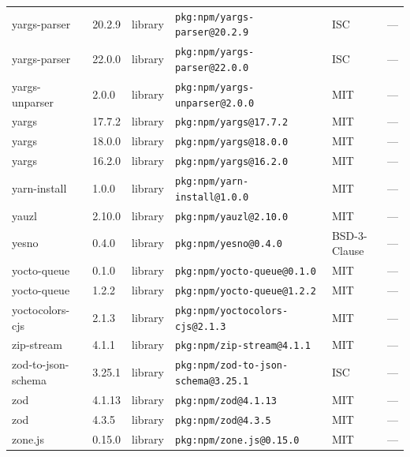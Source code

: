 \documentclass[11pt,a4paper]{article}
\begin{document}
\begin{longtable}{|p{4cm}|p{2cm}|p{1.6cm}|p{5cm}|p{1.5cm}|p{3.5cm}|}
\raggedright yargs-parser & 20.2.9 & library & \small\texttt{pkg:npm/yargs-parser@20.2.9} & ISC & \small — \\
\raggedright yargs-parser & 22.0.0 & library & \small\texttt{pkg:npm/yargs-parser@22.0.0} & ISC & \small — \\
\raggedright yargs-unparser & 2.0.0 & library & \small\texttt{pkg:npm/yargs-unparser@2.0.0} & MIT & \small — \\
\raggedright yargs & 17.7.2 & library & \small\texttt{pkg:npm/yargs@17.7.2} & MIT & \small — \\
\raggedright yargs & 18.0.0 & library & \small\texttt{pkg:npm/yargs@18.0.0} & MIT & \small — \\
\raggedright yargs & 16.2.0 & library & \small\texttt{pkg:npm/yargs@16.2.0} & MIT & \small — \\
\raggedright yarn-install & 1.0.0 & library & \small\texttt{pkg:npm/yarn-install@1.0.0} & MIT & \small — \\
\raggedright yauzl & 2.10.0 & library & \small\texttt{pkg:npm/yauzl@2.10.0} & MIT & \small — \\
\raggedright yesno & 0.4.0 & library & \small\texttt{pkg:npm/yesno@0.4.0} & BSD-3-Clause & \small — \\
\raggedright yocto-queue & 0.1.0 & library & \small\texttt{pkg:npm/yocto-queue@0.1.0} & MIT & \small — \\
\raggedright yocto-queue & 1.2.2 & library & \small\texttt{pkg:npm/yocto-queue@1.2.2} & MIT & \small — \\
\raggedright yoctocolors-cjs & 2.1.3 & library & \small\texttt{pkg:npm/yoctocolors-cjs@2.1.3} & MIT & \small — \\
\raggedright zip-stream & 4.1.1 & library & \small\texttt{pkg:npm/zip-stream@4.1.1} & MIT & \small — \\
\raggedright zod-to-json-schema & 3.25.1 & library & \small\texttt{pkg:npm/zod-to-json-schema@3.25.1} & ISC & \small — \\
\raggedright zod & 4.1.13 & library & \small\texttt{pkg:npm/zod@4.1.13} & MIT & \small — \\
\raggedright zod & 4.3.5 & library & \small\texttt{pkg:npm/zod@4.3.5} & MIT & \small — \\
\raggedright zone.js & 0.15.0 & library & \small\texttt{pkg:npm/zone.js@0.15.0} & MIT & \small — \\
\end{longtable}
\end{document}
